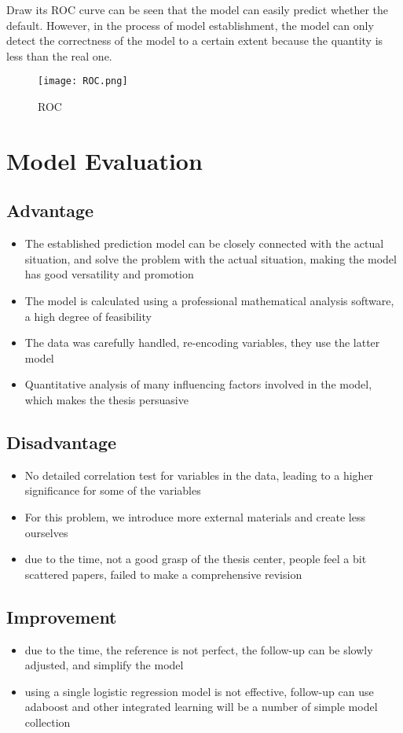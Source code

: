 \documentclass{mcmthesis}
\begin{document}
Draw its ROC curve can be seen that the model can easily predict whether the default. However, in the process of model establishment, the model can only detect the correctness of the model to a certain extent because the quantity is less than the real one.
\begin{figure}[h]
\small
\centering
\texttt{[image: ROC.png]}
\caption{ROC} \label{fig:ROC}
\end{figure}

\section{Model Evaluation}
\subsection{Advantage}
\begin{itemize}
\item The established prediction model can be closely connected with the actual situation, and solve the problem with the actual situation, making the model has good versatility and promotion
\item The model is calculated using a professional mathematical analysis software, a high degree of feasibility
\item The data was carefully handled, re-encoding variables, they use the latter model
\item Quantitative analysis of many influencing factors involved in the model, which makes the thesis persuasive
\end{itemize}
\subsection{Disadvantage}
\begin{itemize}
\item No detailed correlation test for variables in the data, leading to a higher significance for some of the variables
\item For this problem, we introduce more external materials and create less ourselves
\item due to the time, not a good grasp of the thesis center, people feel a bit scattered papers, failed to make a comprehensive revision
\end{itemize}
\subsection{Improvement}
\begin{itemize}
\item due to the time, the reference is not perfect, the follow-up can be slowly adjusted, and simplify the model
\item using a single logistic regression model is not effective, follow-up can use adaboost and other integrated learning will be a number of simple model collection
\end{itemize}
\end{document}
